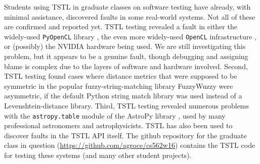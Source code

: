 Students using TSTL in graduate classes on software testing have
already, with minimal assistance, discovered faults in some real-world
systems.  Not all of these are confirmed and reported yet.  TSTL
testing revealed a fault in either the widely-used {\tt PyOpenCL}
library \cite{PyOpenCL}, the even more widely-used {\tt OpenCL}
infrastructure \cite{OpenCL}, or (possibly) the NVIDIA hardware being
used.  We are still investigating this problem, but it appears to be a
genuine fault, though debugging and assigning blame is complex due to
the layers of software and hardware involved.  Second, TSTL testing
found cases where distance metrics that were supposed to be symmetric
in the popular fuzzy-string-matching library FuzzyWuzzy
\cite{FuzzyWuzzy} were asymmetric, if the default Python string match
library was used instead of a Levenshtein-distance library.  Third,
TSTL testing revealed numerous problems with the {\tt astropy.table}
module of the AstroPy library \cite{AstroPy}, used by many
professional astronomers and astrophysicists.  TSTL has also been used
to discover faults in the TSTL API itself.  The github repository for
the graduate class in question
(\url{https://github.com/agroce/cs562w16}) contains the TSTL code for
testing these systems (and many other student projects).
